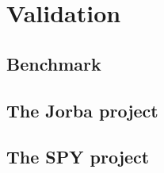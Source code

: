 \section{Validation}
\subsection{Benchmark}
\subsection{The Jorba project}
\subsection{The SPY project}
\newpage